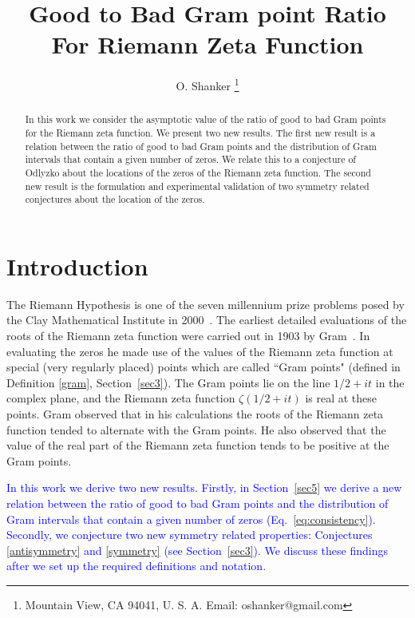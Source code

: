 \documentclass[twoside]{article}
\theoremstyle{definition}
\begin{document}
\date{}
\lhead[]{}
\chead[]{}
\rhead[]{}

\title{\bf{Good to Bad Gram point Ratio For Riemann Zeta Function}}
%

\author{O. Shanker 
 \thanks{Mountain View, CA 94041, U. S. A. Email: oshanker@gmail.com
 }
}

\maketitle
\thispagestyle{fancy}

\begin{abstract}
In this work we consider the asymptotic value of the ratio of good to bad Gram points for the Riemann zeta function.
We present two new results. The first new result is a relation between the ratio of good to bad Gram points and the distribution of Gram intervals that contain a given number of zeros.
We relate this to a conjecture of Odlyzko about the locations of the zeros of the Riemann zeta function.
The  second new result is the formulation and experimental validation of two 
symmetry related conjectures about the location of the zeros.
\end{abstract}



{}


\section{Introduction}
The Riemann Hypothesis is one of the seven millennium prize problems posed by the Clay Mathematical Institute in 2000~\cite{Sarnak 2005}. 
The earliest detailed evaluations of the roots of the Riemann zeta function were carried out in 1903 by Gram~\cite{Gram 1903}.
In evaluating the zeros he made use of the values of the Riemann zeta function at special (very regularly placed) points which are called ``Gram points"
{(defined in Definition \ref{gram}, Section~\ref{sec3})}.
The Gram points lie on the line $1/2+it$ in the complex plane, and the Riemann zeta function $\zeta(1/2+it)$ is real at these points. 
Gram observed that in his calculations the roots of the Riemann zeta function tended to alternate with the Gram points. He also observed that the
value of the real part of the Riemann zeta function tends to be positive at the Gram points. 

\textcolor{blue}{In this work we derive two new results. Firstly, in Section~\ref{sec5} we derive a new relation between the ratio of good to bad Gram points and the distribution of Gram intervals that contain a given number of zeros (Eq.~\ref{eq:consistency}).  Secondly, we conjecture two new symmetry related properties: Conjectures \ref{antisymmetry} and \ref{symmetry}  (see  Section~\ref{sec3}). We discuss these findings after we set up the required definitions and notation. }
\end{document}
